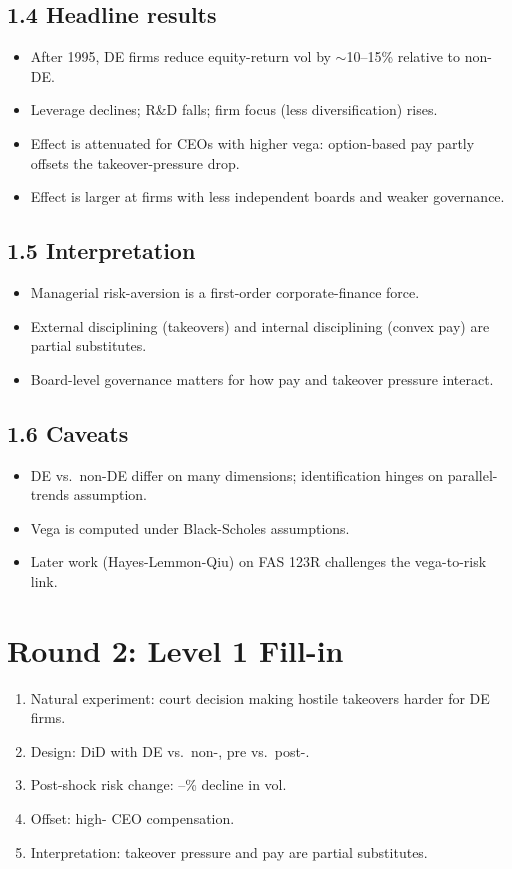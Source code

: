 \documentclass[11pt]{article}
\newcommand{\blank}[1]{\underline{\hspace{#1}}}
\begin{document}
\subsection*{1.4 Headline results}
\begin{itemize}
\item After 1995, DE firms reduce equity-return vol by $\sim$10--15\% relative to non-DE.
\item Leverage declines; R\&D falls; firm focus (less diversification) rises.
\item Effect is attenuated for CEOs with higher vega: option-based pay partly offsets the takeover-pressure drop.
\item Effect is larger at firms with less independent boards and weaker governance.
\end{itemize}

\subsection*{1.5 Interpretation}
\begin{itemize}
\item Managerial risk-aversion is a first-order corporate-finance force.
\item External disciplining (takeovers) and internal disciplining (convex pay) are partial substitutes.
\item Board-level governance matters for how pay and takeover pressure interact.
\end{itemize}

\subsection*{1.6 Caveats}
\begin{alertbox}
\begin{itemize}
\item DE vs.\ non-DE differ on many dimensions; identification hinges on parallel-trends assumption.
\item Vega is computed under Black-Scholes assumptions.
\item Later work (Hayes-Lemmon-Qiu) on FAS 123R challenges the vega-to-risk link.
\end{itemize}
\end{alertbox}

\section*{Round 2: Level 1 Fill-in}
\begin{enumerate}
\item Natural experiment: \blank{1cm} court decision \blank{1cm} making hostile takeovers harder for DE firms.
\item Design: DiD with DE vs.\ non-\blank{1cm}, pre vs.\ post-\blank{1cm}.
\item Post-shock risk change: \blank{1cm}--\blank{1cm}\% decline in vol.
\item Offset: high-\blank{1cm} CEO compensation.
\item Interpretation: takeover pressure and \blank{2cm} pay are partial substitutes.
\end{enumerate}
\end{document}
